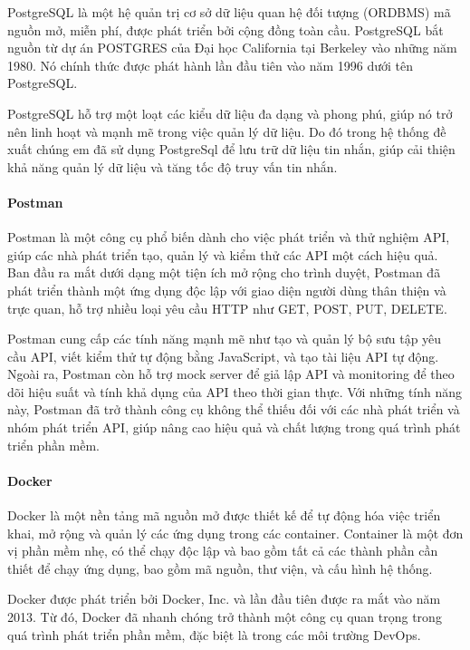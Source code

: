 PostgreSQL là một hệ quản trị cơ sở dữ liệu quan hệ đối tượng (ORDBMS) mã nguồn mở, miễn phí, được phát triển bởi cộng đồng toàn cầu. PostgreSQL bắt nguồn từ dự án POSTGRES của Đại học California tại Berkeley vào những năm 1980. Nó chính thức được phát hành lần đầu tiên vào năm 1996 dưới tên PostgreSQL.

PostgreSQL hỗ trợ một loạt các kiểu dữ liệu đa dạng và phong phú, giúp nó trở nên linh hoạt và mạnh mẽ trong việc quản lý dữ liệu. Do đó trong hệ thống đề xuất chúng em đã sử dụng PostgreSql để lưu trữ dữ liệu tin nhắn, giúp cải thiện khả năng quản lý dữ liệu và tăng tốc độ truy vấn tin nhắn.\cite{postgre}

\paragraph{Postman}
\mbox{}

Postman là một công cụ phổ biến dành cho việc phát triển và thử nghiệm API, giúp các nhà phát triển tạo, quản lý và kiểm thử các API một cách hiệu quả. Ban đầu ra mắt dưới dạng một tiện ích mở rộng cho trình duyệt, Postman đã phát triển thành một ứng dụng độc lập với giao diện người dùng thân thiện và trực quan, hỗ trợ nhiều loại yêu cầu HTTP như GET, POST, PUT, DELETE.\cite{postman_1}

Postman cung cấp các tính năng mạnh mẽ như tạo và quản lý bộ sưu tập yêu cầu API, viết kiểm thử tự động bằng JavaScript, và tạo tài liệu API tự động. Ngoài ra, Postman còn hỗ trợ mock server để giả lập API và monitoring để theo dõi hiệu suất và tính khả dụng của API theo thời gian thực. Với những tính năng này, Postman đã trở thành công cụ không thể thiếu đối với các nhà phát triển và nhóm phát triển API, giúp nâng cao hiệu quả và chất lượng trong quá trình phát triển phần mềm.
\paragraph{Docker}
\mbox{}

Docker là một nền tảng mã nguồn mở được thiết kế để tự động hóa việc triển khai, mở rộng và quản lý các ứng dụng trong các container. Container là một đơn vị phần mềm nhẹ, có thể chạy độc lập và bao gồm tất cả các thành phần cần thiết để chạy ứng dụng, bao gồm mã nguồn, thư viện, và cấu hình hệ thống.

Docker được phát triển bởi Docker, Inc. và lần đầu tiên được ra mắt vào năm 2013. Từ đó, Docker đã nhanh chóng trở thành một công cụ quan trọng trong quá trình phát triển phần mềm, đặc biệt là trong các môi trường DevOps.\cite{docker}

